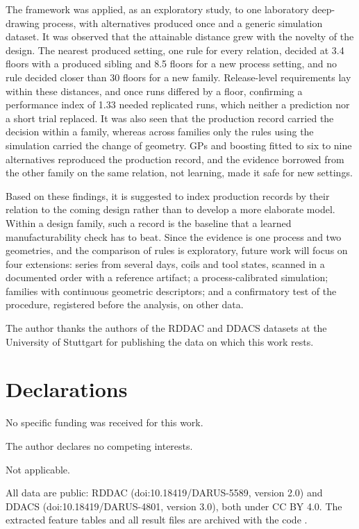 \documentclass[pdflatex,sn-basic,lineno]{sn-jnl}
\begin{document}
The framework was applied, as an exploratory study, to one laboratory deep-drawing process, with alternatives produced once and a generic simulation dataset. It was observed that the attainable distance grew with the novelty of the design. The nearest produced setting, one rule for every relation, decided at 3.4 floors with a produced sibling and 8.5 floors for a new process setting, and no rule decided closer than 30 floors for a new family. Release-level requirements lay within these distances, and once runs differed by a floor, confirming a performance index of 1.33 needed replicated runs, which neither a prediction nor a short trial replaced. It was also seen that the production record carried the decision within a family, whereas across families only the rules using the simulation carried the change of geometry. GPs and boosting fitted to six to nine alternatives reproduced the production record, and the evidence borrowed from the other family on the same relation, not learning, made it safe for new settings.

Based on these findings, it is suggested to index production records by their relation to the coming design rather than to develop a more elaborate model. Within a design family, such a record is the baseline that a learned manufacturability check has to beat. Since the evidence is one process and two geometries, and the comparison of rules is exploratory, future work will focus on four extensions: series from several days, coils and tool states, scanned in a documented order with a reference artifact; a process-calibrated simulation; families with continuous geometric descriptors; and a confirmatory test of the procedure, registered before the analysis, on other data.


\backmatter

The author thanks the authors of the RDDAC and DDACS datasets at the University of Stuttgart for publishing the data on which this work rests.

\section*{Declarations}

No specific funding was received for this work.

The author declares no competing interests.

Not applicable.

All data are public: RDDAC (doi:10.18419/DARUS-5589, version 2.0) and DDACS (doi:10.18419/DARUS-4801, version 3.0), both under CC BY 4.0. The extracted feature tables and all result files are archived with the code \citep{canseven2026archive}.
\end{document}
